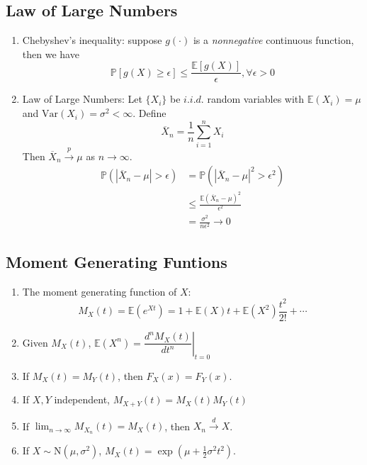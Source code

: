 \documentclass[%
 aip,
 jmp,%
 amsmath,amssymb,
 reprint,%
]{revtex4-1}
\newenvironment{note}{\color{gray}\footnotesize}{}
\def\P{\mathbb{P}}
\def\E{\mathbb{E}}
\def\Var{\mathrm{Var}}
\def\normal{\mathrm{N}}
\begin{document}
\subsection{Law of Large Numbers}
\begin{enumerate}
  \item Chebyshev's inequality: suppose $g(\cdot)$ is a \emph{nonnegative}
        continuous function, then we have
        $$ \P[g(X) \ge \epsilon] \le \frac{\E[g(X)]}{\epsilon}, \forall\epsilon>0 $$

  \item Law of Large Numbers: Let $\{X_i\}$ be $i.i.d.$ random variables with
  $\E(X_i) = \mu$ and $\Var(X_i) = \sigma^2 <\infty$.
  Define $$\overline{X}_n = \frac{1}{n}\sum_{i=1}^{n}X_i$$
  Then $\overline{X}_n \overset{p}{\to} \mu$ as $n\to\infty$.
    \begin{note}
      \begin{align*}
        \P(|\overline{X}_n - \mu| > \epsilon) &= \P(|\overline{X}_n - \mu|^2 > \epsilon^2) \\
          &\leq \frac{\E(\overline{X}_n - \mu)^2}{\epsilon^2} \\
          &= \frac{\sigma^2}{n\epsilon^2} \to 0
      \end{align*}
    \end{note}

\end{enumerate}


\subsection{Moment Generating Funtions}
\begin{enumerate}
  \item The moment generating function of $X$:
  $$ M_X(t) = \E(e^{Xt}) = 1 + \E(X)t + \E(X^2)\frac{t^2}{2!}+\cdots $$
  \item Given $M_X(t)$, $\E(X^n) = \left.\dfrac{d^n M_X(t)}{dt^n}\right\rvert_{t=0}$
  \item If $M_X(t)=M_Y(t)$, then $F_X(x) = F_Y(x)$.
  \item If $X,Y$ independent, $M_{X+Y}(t) = M_X(t) M_Y(t)$
  \item If $\lim_{n\to\infty} M_{X_n}(t) = M_X(t)$, then $X_n \overset{d}{\to} X$.
  \item If $X \sim \normal(\mu, \sigma^2)$, $M_X(t)=\exp\left(\mu+\frac{1}{2}\sigma^2t^2\right)$.
\end{enumerate}
\end{document}
